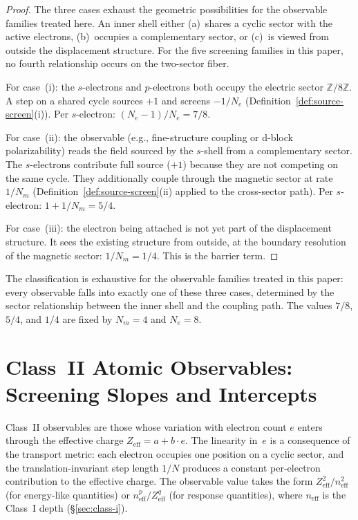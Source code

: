 \documentclass[11pt,a4paper]{article}
\begin{document}
\begin{proof}
The three cases exhaust the geometric possibilities for the observable families treated here. An inner shell either (a)~shares a cyclic sector with the active electrons, (b)~occupies a complementary sector, or (c)~is viewed from outside the displacement structure. For the five screening families in this paper, no fourth relationship occurs on the two-sector fiber.

For case~(i): the $s$-electrons and $p$-electrons both occupy the electric sector $\mathbb{Z}/8\mathbb{Z}$. A step on a shared cycle sources $+1$ and screens $-1/N_e$ (Definition~\ref{def:source-screen}(i)). Per $s$-electron: $(N_e - 1)/N_e = 7/8$.

For case~(ii): the observable (e.g., fine-structure coupling or d-block polarizability) reads the field sourced by the $s$-shell from a complementary sector. The $s$-electrons contribute full source ($+1$) because they are not competing on the same cycle. They additionally couple through the magnetic sector at rate $1/N_m$ (Definition~\ref{def:source-screen}(ii) applied to the cross-sector path). Per $s$-electron: $1 + 1/N_m = 5/4$.

For case~(iii): the electron being attached is not yet part of the displacement structure. It sees the existing structure from outside, at the boundary resolution of the magnetic sector: $1/N_m = 1/4$. This is the barrier term.
\end{proof}

The classification is exhaustive for the observable families treated in this paper: every observable falls into exactly one of these three cases, determined by the sector relationship between the inner shell and the coupling path. The values $7/8$, $5/4$, and $1/4$ are fixed by $N_m = 4$ and $N_e = 8$.

\section{Class~II Atomic Observables: Screening Slopes and Intercepts}
\label{sec:class-ii}

Class~II observables are those whose variation with electron count $e$ enters through the effective charge $Z_{\mathrm{eff}} = a + b \cdot e$. The linearity in~$e$ is a consequence of the transport metric: each electron occupies one position on a cyclic sector, and the translation-invariant step length $1/N$ produces a constant per-electron contribution to the effective charge. The observable value takes the form $Z_{\mathrm{eff}}^2/n_{\mathrm{eff}}^2$ (for energy-like quantities) or $n_{\mathrm{eff}}^p/Z_{\mathrm{eff}}^q$ (for response quantities), where $n_{\mathrm{eff}}$ is the Class~I depth (\S\ref{sec:class-i}).
\end{document}
